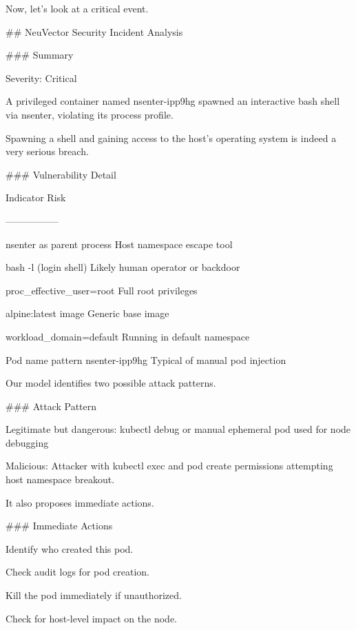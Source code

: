 Now, let's look at a critical event.

\indent\colorbox{codegrey}{
    \parbox{0.8\linewidth}{
\#\# NeuVector Security Incident Analysis
    }
}

\indent\colorbox{codegrey}{
    \parbox{0.8\linewidth}{
\#\#\# Summary

Severity: Critical

A privileged container named nsenter-ipp9hg spawned an interactive bash shell via nsenter, violating its process profile.     
     }
}

Spawning a shell and gaining access to the host's operating system is indeed a very serious breach.

\indent\colorbox{codegrey}{
    \parbox{0.8\linewidth}{
\#\#\# Vulnerability Detail

\textbar{} Indicator \textbar{} Risk \textbar{}

\textbar{}-----------\textbar{}------\textbar{}

\textbar{} nsenter as parent process \textbar{} Host namespace escape tool \textbar{}

\textbar{} bash -l (login shell) \textbar{} Likely human operator or backdoor \textbar{}

\textbar{} proc\_effective\_user=root \textbar{} Full root privileges \textbar{}

\textbar{} alpine:latest image \textbar{} Generic base image \textbar{}

\textbar{} workload\_domain=default \textbar{} Running in default namespace \textbar{}

\textbar{} Pod name pattern nsenter-ipp9hg \textbar{} Typical of manual pod injection \textbar{}
    }
}

Our model identifies two possible attack patterns.

\indent\colorbox{codegrey}{
    \parbox{0.8\linewidth}{
\#\#\# Attack Pattern

Legitimate but dangerous: kubectl debug or manual ephemeral pod used for node debugging
   
Malicious: Attacker with kubectl exec and pod create permissions attempting host namespace breakout.
    }
}

It also proposes immediate actions.

\indent\colorbox{codegrey}{
    \parbox{0.8\linewidth}{
\#\#\# Immediate Actions

Identify who created this pod.

Check audit logs for pod creation.

Kill the pod immediately if unauthorized.

Check for host-level impact on the node.
    }
}

